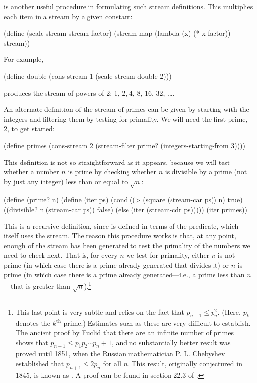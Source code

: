 \noindent
{} is another useful procedure in formulating such stream
definitions.  This multiplies each item in a stream by a given constant:

\begin{codeBlock}
(define (scale-stream stream factor)
  (stream-map (lambda (x) (* x factor))
              stream))
\end{codeBlock}

\noindent
For example,

\begin{codeBlock}
(define double (cons-stream 1 (scale-stream double 2)))
\end{codeBlock}

\noindent
produces the stream of powers of 2: 1, 2, 4, 8, 16, 32, \( \dots \).

An alternate definition of the stream of primes can be given by starting with
the integers and filtering them by testing for primality.  We will need the
first prime, 2, to get started:

\begin{codeBlock}
(define primes
  (cons-stream
   2
   (stream-filter prime? (integers-starting-from 3))))
\end{codeBlock}

\noindent
This definition is not so straightforward as it appears, because we will test
whether a number \( n \) is prime by checking whether \( n \) is divisible by a
prime (not by just any integer) less than or equal to \( \sqrt{n} \):

\begin{codeBlock}
(define (prime? n)
  (define (iter ps)
    (cond ((> (square (stream-car ps)) n) true)
          ((divisible? n (stream-car ps)) false)
          (else (iter (stream-cdr ps)))))
  (iter primes))
\end{codeBlock}

\noindent
This is a recursive definition, since  is defined in terms of the
 predicate, which itself uses the  stream.  The
reason this procedure works is that, at any point, enough of the 
stream has been generated to test the primality of the numbers we need to check
next.  That is, for every \( n \) we test for primality, either \( n \) is not
prime (in which case there is a prime already generated that divides it) or
\( n \) is prime (in which case there is a prime already generated---i.e., a
prime less than \( n \)---that is greater than
\( \sqrt{n} \)).\footnote{This last point is very subtle and relies on
the fact that \( p_{n+1} \le p_n^2 \).  (Here, \( p_k \) denotes the
\( k^{\mathrm{th}} \) prime.)  Estimates such as these are very difficult to establish.  The
ancient proof by Euclid that there are an infinite number of primes shows that
\( p_{n+1} \le p_1 p_2 \cdots p_n + 1 \), and no substantially
better result was proved until 1851, when the Russian mathematician
P. L. Chebyshev established that \( p_{n+1} \le 2p_n \) for all \( n \).
This result, originally conjectured in 1845, is known as .  A proof can be found in section 22.3 of .}

